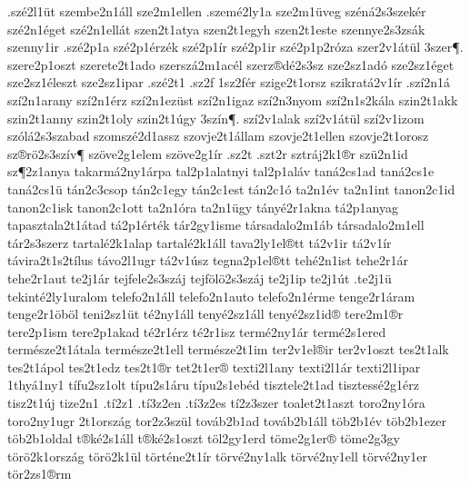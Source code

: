 {.sz^^e92l1^^fct
szembe2n1^^e1ll
sze2m1ellen
.szem^^e92ly1a
sze2m1^^fcveg
sz^^e9n^^e12s3szek^^e9r
sz^^e92n1^^e9get
sz^^e92n1ell^^e1t
szen2t1atya
szen2t1egyh
szen2t1este
szennye2s3zs^^e1k
szenny1ir
.sz^^e92p1a
sz^^e92p1^^e9rz^^e9k
sz^^e92p1^^edr
sz^^e92p1ir
sz^^e92p1p2r^^f3za
szer2v1^^e1t^^fcl
3szer^^b6.
szere2p1oszt
szerete2t1ado
szersz^^e12m1ac^^e9l
szerz^^aed^^e92s3sz
sze2sz1ad^^f3
sze2sz1^^e9get
sze2sz1^^e9leszt
sze2sz1ipar
.sz^^e92t1
.sz2f
1sz2f^^e9r
szige2t1orsz
szikrat^^e12v1^^edr
.sz^^ed2n1^^e1
sz^^ed2n1arany
sz^^ed2n1^^e9rz
sz^^ed2n1ez^^fcst
sz^^ed2n1igaz
sz^^ed2n3nyom
sz^^ed2n1s2k^^e1la
szin2t1akk
szin2t1anny
szin2t1oly
szin2t1^^fagy
3sz^^edn^^b6.
sz^^ed2v1alak
sz^^ed2v1^^e1t^^fcl
sz^^ed2v1izom
sz^^f3l^^e12s3szabad
szomsz^^e92d1assz
szovje2t1^^e1llam
szovje2t1ellen
szovje2t1orosz
sz^^aer^^f62s3sz^^edv^^b6
sz^^f6ve2g1elem
sz^^f6ve2g1^^edr
.sz2t
.szt2r
sztr^^e1j2k1^^aer
sz^^fc2n1id
sz^^b62z1anya
takarm^^e12ny1^^e1rpa
tal2p1alatnyi
tal2p1al^^e1v
tan^^e12cs1ad
tan^^e12cs1e
tan^^e12cs1^^fc
t^^e1n2c3csop
t^^e1n2c1egy
t^^e1n2c1est
t^^e1n2c1^^f3
ta2n1^^e9v
ta2n1int
tanon2c1id
tanon2c1isk
tanon2c1ott
ta2n1^^f3ra
ta2n1^^fcgy
t^^e1ny^^e92r1akna
t^^e12p1anyag
tapasztala2t1^^e1tad
t^^e12p1^^e9rt^^e9k
t^^e1r2gy1isme
t^^e1rsadalo2m1^^e1b
t^^e1rsadalo2m1ell
t^^e1r2s3szerz %
tartal^^e92k1alap
tartal^^e92k1^^e1ll
tava2ly1el^^aett
t^^e12v1ir
t^^e12v1^^edr
t^^e1vira2t1s2t^^edlus
t^^e1vo2l1ugr
t^^e12v1^^fasz
tegna2p1el^^aett
teh^^e92n1ist
tehe2r1^^e1r
tehe2r1aut
te2j1^^e1r
tejfele2s3sz^^e1j %
tejf^^f6l^^f62s3sz^^e1j %
te2j1ip
te2j1^^fat
.te2j1^^fc
tekint^^e92ly1uralom
telefo2n1^^e1ll
telefo2n1auto
telefo2n1^^e9rme
tenge2r1^^e1ram
tenge2r1^^f6b^^f6l
teni2sz1^^fct
t^^e92ny1^^e1ll
teny^^e92sz1^^e1ll
teny^^e92sz1id^^ae
tere2m1^^aer
tere2p1ism
tere2p1akad
t^^e92r1^^e9rz
t^^e92r1isz
term^^e92ny1^^e1r
term^^e92s1ered
term^^e9sze2t1^^e1tala
term^^e9sze2t1ell
term^^e9sze2t1im
ter2v1el^^aeir
ter2v1oszt
tes2t1alk
tes2t1^^e1pol
tes2t1edz
tes2t1^^aer
tet2t1er^^ae
texti2l1any
texti2l1^^e1r
texti2l1ipar
1thy^^e11ny1 %
t^^edfu2sz1olt
t^^edpu2s1^^e1ru
t^^edpu2s1eb^^e9d
tisztele2t1ad
tisztess^^e92g1^^e9rz
tisz2t1^^faj
tize2n1
.t^^ed2z1
.t^^ed3z2en
.t^^ed3z2es
t^^ed2z3szer
toalet2t1aszt
toro2ny1^^f3ra
toro2ny1ugr
2t1orsz^^e1g %
tor2z3sz^^fcl
tov^^e1b2b1ad
tov^^e1b2b1^^e1ll
t^^f6b2b1^^e9v
t^^f6b2b1ezer
t^^f6b2b1oldal
t^^aek^^e92s1^^e1ll
t^^aek^^e92s1oszt
t^^f6l2gy1erd
t^^f6me2g1er^^ae
t^^f6me2g3gy
t^^f6r^^f62k1orsz^^e1g
t^^f6r^^f62k1^^fcl
t^^f6rt^^e9ne2t1^^edr
t^^f6rv^^e92ny1alk
t^^f6rv^^e92ny1ell
t^^f6rv^^e92ny1er
t^^f6r2zs1^^aerm
}
